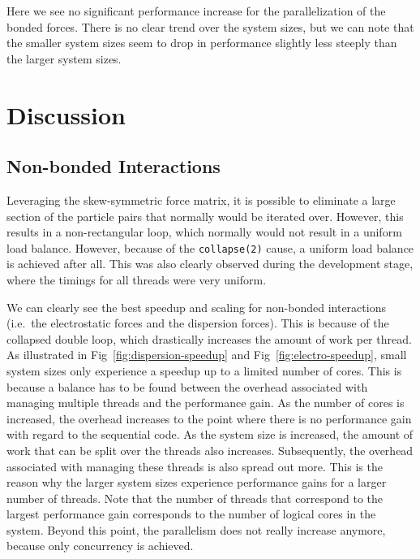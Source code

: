 \documentclass[conference]{IEEEtran}
\begin{document}
    Here we see no significant performance increase for the parallelization of the bonded forces. There is no
    clear trend over the system sizes, but we can note that the smaller system sizes seem to drop in performance
    slightly less steeply than the larger system sizes.


\section{Discussion}\label{discussion}
\subsection{Non-bonded Interactions}

Leveraging the skew-symmetric
force matrix, it is possible to eliminate a large section of the particle pairs that normally would be iterated
over. However, this results in a non-rectangular loop, which normally would not result in a uniform load balance.
However, because of the \verb|collapse(2)| cause, a uniform load balance is achieved after all. This was also
clearly observed during the development stage, where the timings for all threads were very uniform.

We can clearly see the best speedup and scaling for non-bonded interactions (i.e.\ the electrostatic forces and 
the dispersion forces). This is because of the collapsed double loop, which drastically increases the amount of
work per thread. As illustrated in Fig~\ref{fig:dispersion-speedup} and Fig~\ref{fig:electro-speedup}, small system
sizes only experience a speedup up to a limited number of cores. This is because a balance has to be found between
the overhead associated with managing multiple threads and the performance gain. As the number of cores is increased,
the overhead increases to the point where there is no performance gain with regard to the sequential code. As the
system size is increased, the amount of work that can be split over the threads also increases. Subsequently, the
overhead associated with managing these threads is also spread out more. This is the reason why the larger system
sizes experience performance gains for a larger number of threads. Note that the number of threads that correspond
to the largest performance gain corresponds to the number of logical cores in the system. Beyond this point, the
parallelism does not really increase anymore, because only concurrency is achieved.
\end{document}

